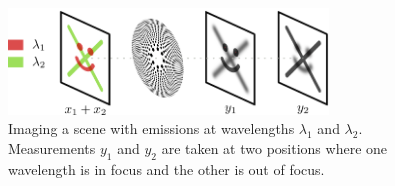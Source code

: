 \documentclass{article}
\begin{document}




\begin{figure}[htb]
  \begin{minipage}[b]{1\linewidth}
    \centering
    \centerline{\includegraphics[width=8.5cm]{diffraction_system}}
  \end{minipage}
  \caption{Imaging a scene with emissions at wavelengths $\lambda_1$ and
  $\lambda_2$. Measurements $y_1$ and $y_2$ are taken at two positions where one wavelength
  is in focus and the other is out of focus.}
  \label{fig:pssi_drawing}
\end{figure}


\end{document}
